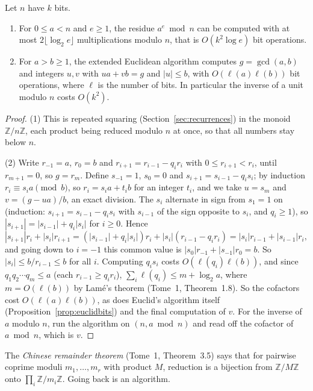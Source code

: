 \begin{proposition}\label{prop:modops}
Let $n$ have $k$ bits.
\begin{enumerate}
\item For $0\le a<n$ and $e\ge1$, the residue $a^e\bmod n$ can be computed with at most $2\lfloor\log_2e\rfloor$ multiplications modulo $n$, that is $O(k^2\log e)$ bit operations.
\item For $a>b\ge1$, the extended Euclidean algorithm computes $g=\gcd(a,b)$ and integers $u,v$ with $ua+vb=g$ and $|u|\le b$, with $O(\ell(a)\ell(b))$ bit operations, where $\ell$ is the number of bits. In particular the inverse of a unit modulo $n$ costs $O(k^2)$.
\end{enumerate}
\end{proposition}
\begin{proof}
(1) This is repeated squaring (Section~\ref{sec:recurrences}) in the monoid $\mathbb Z/n\mathbb Z$, each product being reduced modulo $n$ at once, so that all numbers stay below $n$.

(2) Write $r_{-1}=a$, $r_0=b$ and $r_{i+1}=r_{i-1}-q_ir_i$ with $0\le r_{i+1}<r_i$, until $r_{m+1}=0$, so $g=r_m$. Define $s_{-1}=1$, $s_0=0$ and $s_{i+1}=s_{i-1}-q_is_i$; by induction $r_i\equiv s_ia\pmod b$, so $r_i=s_ia+t_ib$ for an integer $t_i$, and we take $u=s_m$ and $v=(g-ua)/b$, an exact division.
The $s_i$ alternate in sign from $s_1=1$ on (induction: $s_{i+1}=s_{i-1}-q_is_i$ with $s_{i-1}$ of the sign opposite to $s_i$, and $q_i\ge1$), so $|s_{i+1}|=|s_{i-1}|+q_i|s_i|$ for $i\ge0$. Hence
\[
|s_{i+1}|r_i+|s_i|r_{i+1}=(|s_{i-1}|+q_i|s_i|)r_i+|s_i|(r_{i-1}-q_ir_i)=|s_i|r_{i-1}+|s_{i-1}|r_i,
\]
and going down to $i=-1$ this common value is $|s_0|r_{-1}+|s_{-1}|r_0=b$. So $|s_i|\le b/r_{i-1}\le b$ for all $i$. Computing $q_is_i$ costs $O(\ell(q_i)\ell(b))$, and since $q_1q_2\cdots q_m\le a$ (each $r_{i-1}\ge q_ir_i$), $\sum_i\ell(q_i)\le m+\log_2a$, where $m=O(\ell(b))$ by Lamé's theorem (Tome~1, Theorem~1.8).
So the cofactors cost $O(\ell(a)\ell(b))$, as does Euclid's algorithm itself (Proposition~\ref{prop:euclidbits}) and the final computation of $v$. For the inverse of $a$ modulo $n$, run the algorithm on $(n,a\bmod n)$ and read off the cofactor of $a\bmod n$, which is $v$.
\end{proof}

The \emph{Chinese remainder theorem} (Tome~1, Theorem~3.5) says that for pairwise coprime moduli $m_1,\dots,m_r$ with product $M$, reduction is a bijection from $\mathbb Z/M\mathbb Z$ onto $\prod_i\mathbb Z/m_i\mathbb Z$. Going back is an algorithm.

